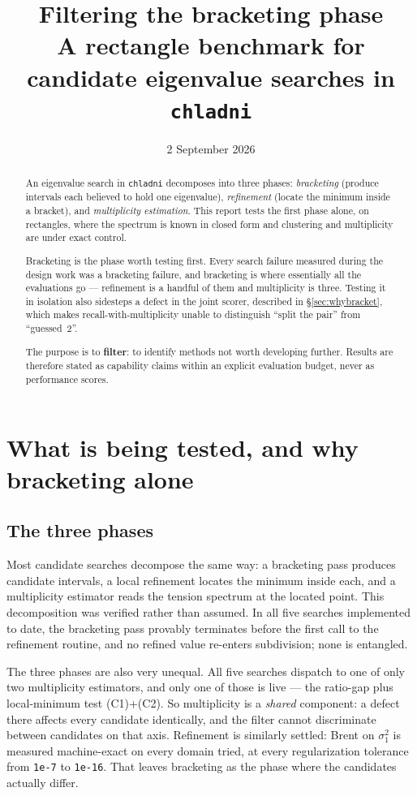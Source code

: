 \documentclass[11pt,a4paper]{article}
\title{Filtering the bracketing phase\\
\large A rectangle benchmark for candidate eigenvalue searches in \texttt{chladni}}
\author{}
\date{2 September 2026}
\newcommand{\sig}{\ensuremath{\sigma}}
\begin{document}
\maketitle

\begin{abstract}
\noindent
An eigenvalue search in \texttt{chladni} decomposes into three phases: \emph{bracketing}
(produce intervals each believed to hold one eigenvalue), \emph{refinement} (locate the minimum
inside a bracket), and \emph{multiplicity estimation}. This report tests the first phase alone,
on rectangles, where the spectrum is known in closed form and clustering and multiplicity are
under exact control.

Bracketing is the phase worth testing first. Every search failure measured during the design
work was a bracketing failure, and bracketing is where essentially all the evaluations go ---
refinement is a handful of them and multiplicity is three. Testing it in isolation also
sidesteps a defect in the joint scorer, described in \S\ref{sec:whybracket}, which makes
recall-with-multiplicity unable to distinguish ``split the pair'' from ``guessed~2''.

The purpose is to \textbf{filter}: to identify methods not worth developing further. Results are
therefore stated as capability claims within an explicit evaluation budget, never as performance
scores.
\end{abstract}

\tableofcontents
\newpage

\section{What is being tested, and why bracketing alone}
\label{sec:whybracket}

\subsection{The three phases}

Most candidate searches decompose the same way: a bracketing pass produces candidate intervals,
a local refinement locates the minimum inside each, and a multiplicity estimator reads the
tension spectrum at the located point. This decomposition was verified rather than assumed. In
all five searches implemented to date, the bracketing pass provably terminates before the first
call to the refinement routine, and no refined value re-enters subdivision; none is entangled.

The three phases are also very unequal. All five searches dispatch to one of only two
multiplicity estimators, and only one of those is live --- the ratio-gap plus local-minimum test
(C1)+(C2). So multiplicity is a \emph{shared} component: a defect there affects every candidate
identically, and the filter cannot discriminate between candidates on that axis. Refinement is
similarly settled: Brent on $\sig_1^2$ is measured machine-exact on every domain tried, at every
regularization tolerance from \texttt{1e-7} to \texttt{1e-16}. That leaves bracketing as the
phase where the candidates actually differ.
\end{document}
